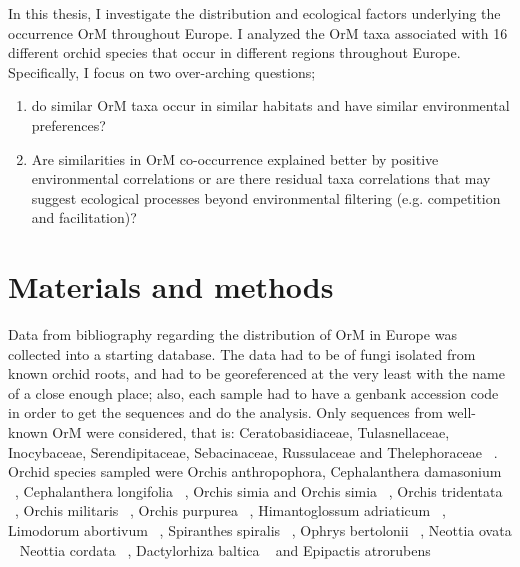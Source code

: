 In this thesis, I investigate the distribution and ecological factors underlying the occurrence OrM throughout Europe. I analyzed the OrM taxa associated with 16 different orchid species that occur in different regions throughout Europe. Specifically, I focus on two over-arching questions;

\begin{enumerate}
\item do similar OrM taxa occur in similar habitats and have similar environmental preferences?

\item Are similarities in OrM co-occurrence explained better by positive environmental correlations or are there residual taxa correlations that may suggest ecological processes beyond environmental filtering (e.g. competition and facilitation)?

\end{enumerate}

\part{Materials and methods}
\label{materialsandmethods}

Data from bibliography regarding the distribution of OrM in Europe was collected into a starting database. The data had to be of fungi isolated from known orchid roots, and had to be georeferenced at the very least with the name of a close enough place; also, each sample had to have a genbank accession code in order to get the sequences and do the analysis.
Only sequences from well-known OrM were considered, that is: Ceratobasidiaceae, Tulasnellaceae, Inocybaceae, Serendipitaceae, Sebacinaceae, Russulaceae and Thelephoraceae ~\citep{dearnaley2012}.
Orchid species sampled were Orchis anthropophora, Cephalanthera damasonium ~\citep{julou2005}, Cephalanthera longifolia ~\citep{pecoraro2017}, Orchis simia and Orchis simia ~\citep{schatz2010, lievens2010}, Orchis tridentata ~\citep{pecoraro2012}, Orchis militaris ~\citep{shefferson2008}, Orchis purpurea ~\citep{lievens2010}, Himantoglossum adriaticum ~\citep{pecoraro2013}, Limodorum abortivum ~\citep{girlanda2005}, Spiranthes spiralis ~\citep{duffy2019}, Ophrys bertolonii ~\citep{pecoraro2015}, Neottia ovata ~\citep{hansjacquemyn2015, tesitelova2015} Neottia cordata ~\citep{tesitelova2015}, Dactylorhiza baltica ~\citep{shefferson2008} and Epipactis atrorubens ~\citep{shefferson2008}

